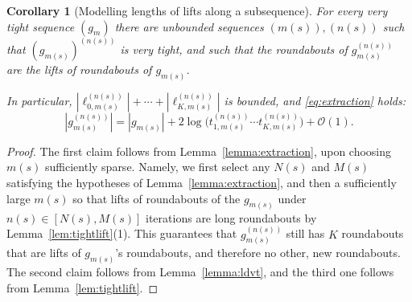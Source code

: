 \documentclass{amsart}
\newcommand\N{{\mathbb{N}}}
\newtheorem{cor}[thm]{Corollary}
\theoremstyle{definition}
\theoremstyle{remark}
\begin{document}
\begin{cor}[Modelling lengths of lifts along a subsequence]\label{cor:m_n}
  For every very tight sequence $(g_m)$ there are unbounded sequences $(m(s)),(n(s))$ such that $(g_{m(s)})^{(n(s))}$ is very tight, and such that the roundabouts of $g_{m(s)}^{(n(s))}$ are the lifts of roundabouts of $g_{m(s)}$.

  In particular, $|\ell_{0,m(s)}^{(n(s))}|+\cdots+|\ell_{K,m(s)}^{(n(s))}|$ is bounded, and \eqref{eq:extraction} holds:
  \[|g_{m(s)}^{(n(s))}|=|g_{m(s)}|+2\log\Big(t_{1,m(s)}^{(n(s))}\cdots t_{K,m(s)}^{(n(s))}\Big)+\mathcal O(1).\]
\end{cor}
\begin{proof}
  The first claim follows from Lemma~\ref{lemma:extraction}, upon choosing $m(s)$ sufficiently sparse. Namely, we first select any $N(s)$ and $M(s)$ satisfying the hypotheses of Lemma~\ref{lemma:extraction}, and then a sufficiently large $m(s)$ so that lifts of roundabouts of the $g_{m(s)}$ under $n(s)\in[N(s),M(s)]$ iterations are long roundabouts by Lemma~\ref{lem:tightlift}(1). This guarantees that $g_{m(s)}^{(n(s))}$ still has $K$ roundabouts that are lifts of $g_{m(s)}$'s roundabouts, and therefore no other, new roundabouts. The second claim follows from Lemma~\ref{lemma:ldvt}, and the third one follows from Lemma~\ref{lem:tightlift}.
\end{proof}

%
%  
\end{document}
